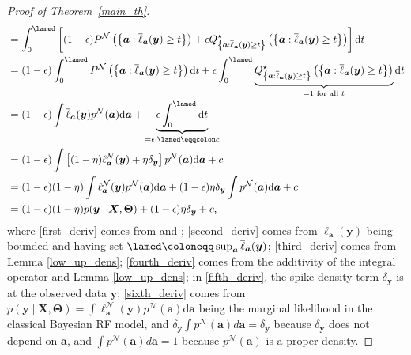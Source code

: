 \documentclass[12pt, english, oneside, a4paper]{article}
\newcommand{\y}{\boldsymbol{y}}
\newcommand{\X}{\boldsymbol{X}}
\renewcommand{\a}{\boldsymbol{a}}
\newcommand{\bT}{\boldsymbol{\Theta}}
\begin{document}
\begin{proof}[Proof of Theorem~\ref{main_th}]
\begin{align}
        &= \int_0^\lamed \left[ (1-\epsilon) P^\mathcal{N}\left( \left\lbrace{\a : \overline{\ell}_{\a}(\y) \geq t}\right\rbrace \right) + \epsilon Q^\star_{\left\lbrace{\a : \overline{\ell}_{\a}(\y) \geq t}\right\rbrace} \left( \left\lbrace{\a : \overline{\ell}_{\a}(\y) \geq t}\right\rbrace \right) \right] \text{d}t \label{third_deriv}\\
        &=(1-\epsilon)\int_0^\lamed P^\mathcal{N}\left( \left\lbrace{\a : \overline{\ell}_{\a}(\y) \geq t}\right\rbrace \right) \text{d}t  + \epsilon \int_0^\lamed \underbrace{Q^\star_{\left\lbrace{\a : \overline{\ell}_{\a}(\y) \geq t}\right\rbrace} \left( \left\lbrace{\a : \overline{\ell}_{\a}(\y) \geq t}\right\rbrace \right)}_{=1 \text{ for all } t} \text{d}t \label{fourth_deriv}\\
        &=(1-\epsilon) \int \overline{\ell}_{\a}(\y) p^\mathcal{N}(\a) \text{d}\a + \underbrace{\epsilon \int_0^\lamed \text{d}t}_{= \epsilon\cdot \lamed \eqqcolon c}\nonumber\\
        &=(1-\epsilon) \int \left[ (1-\eta) \ell^\mathcal{N}_{\a}(\y) + \eta \delta_{\y} \right] p^\mathcal{N}(\a) \text{d}\a +c \label{fifth_deriv}\\
        &=(1-\epsilon)(1-\eta) \int \ell^\mathcal{N}_{\a}(\y) p^\mathcal{N}(\a) \text{d}\a + (1-\epsilon)\eta \delta_{\y} \int p^\mathcal{N}(\a) \text{d}\a +c \nonumber\\
        &=(1-\epsilon)(1-\eta)p(\y \mid \X,\bT) + (1-\epsilon)\eta \delta_{\y} + c, \label{sixth_deriv}
    \end{align}
where \eqref{first_deriv} comes from \citet[Proposition C.3]{decooman} and \citet[Equation (11)]{marinacci2}; \eqref{second_deriv} comes from $\overline{\ell}_{\a}(\y)$ being bounded and having set $\lamed \coloneqq \sup_{\a} \overline{\ell}_{\a}(\y)$; \eqref{third_deriv} comes from Lemma \ref{low_up_dens}; \eqref{fourth_deriv} comes from the additivity of the integral operator and Lemma \ref{low_up_dens}; in \eqref{fifth_deriv}, the spike density term $\delta_{\y}$ is at the observed data $\mathbf{y}$; \eqref{sixth_deriv} comes from $p(\y \mid \X,\bT)=\int \ell^\mathcal{N}_{\a}(\y) p^\mathcal{N}(\a) \text{d}\a$ being the marginal likelihood in the classical Bayesian RF model, and $\delta_{\y}\int p^\mathcal{N}(\a) d\a=\delta_{\y}$ because $\delta_{\y}$ does not depend on $\a$, and $\int p^\mathcal{N}(\a) d\a=1$
because $p^\mathcal{N}(\a)$ is a proper density. 


\end{proof}
\end{document}
